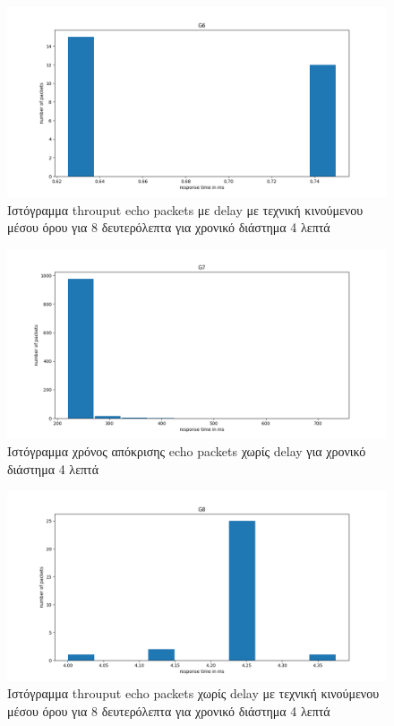 \documentclass{article}
\begin{document}
\begin{figure}[H]
  \begin{center}
    \includegraphics[width=\textwidth]{G6.png}
  \end{center}
  \caption{Ιστόγραμμα throuput echo packets με delay με τεχνική κινούμενου μέσου όρου για 8
  δευτερόλεπτα για χρονικό διάστημα 4 λεπτά}
\end{figure}

\begin{figure}[H]
  \begin{center}
    \includegraphics[width=\textwidth]{G7.png}
  \end{center}
  \caption{Ιστόγραμμα χρόνος απόκρισης echo packets χωρίς delay για χρονικό διάστημα 4 λεπτά}
\end{figure}

\begin{figure}[H]
  \begin{center}
    \includegraphics[width=\textwidth]{G8.png}
  \end{center}
  \caption{Ιστόγραμμα throuput echo packets χωρίς delay με τεχνική κινούμενου μέσου όρου για 8
  δευτερόλεπτα για χρονικό διάστημα 4 λεπτά}
\end{figure}
\end{document}
